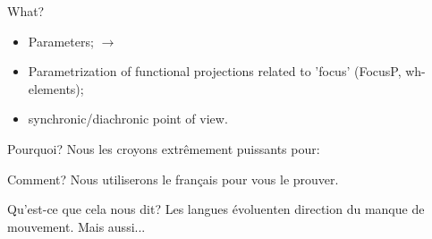 \documentclass[lesson_slides]{subfiles}
\begin{document}
\begin{frame}[c]{What?}

    \begin{itemize}
        \item[\ding{227}] Parameters; \pause $\longrightarrow$ \cite{rizzi2017} \pause
        \item[\ding{227}] Parametrization of functional projections related to 'focus' (FocusP, wh-elements); \pause
        \item[\ding{227}] synchronic/diachronic point of view.
    \end{itemize}
    
\end{frame}
\begin{frame}[c]{Pourquoi?}
  Nous les croyons extrêmement puissants pour:
\end{frame}
\begin{frame}[c]{Comment?}
  Nous utiliserons le français pour vous le prouver.
\end{frame}
\begin{frame}[c]{Qu'est-ce que cela nous dit?}
  Les langues évoluenten direction du manque de mouvement.
  Mais aussi...
\end{frame}
\end{document}
